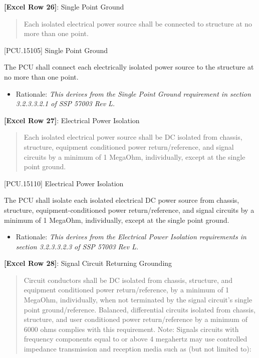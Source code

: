 \textbf{[Excel Row 26]}: Single Point Ground

\begin{quote}
Each isolated electrical power source shall be connected to structure at no more than one point.
\end{quote}

[PCU.15105] Single Point Ground

The PCU shall connect each electrically isolated power source to the structure at no more than one point.

\begin{itemize}
\item{} Rationale: \emph{This derives from the Single Point Ground requirement in section 3.2.3.3.2.1 of SSP 57003 Rev L.}

\end{itemize}

\textbf{[Excel Row 27]}: Electrical Power Isolation

\begin{quote}
Each isolated electrical power source shall be DC isolated from chassis, structure, equipment conditioned power return\slash reference, and signal circuits by a minimum of 1 MegaOhm, individually, except at the single point ground.
\end{quote}

[PCU.15110] Electrical Power Isolation

The PCU shall isolate each isolated electrical DC power source from chassis, structure, equipment-conditioned power return\slash reference, and signal circuits by a minimum of 1 MegaOhm, individually, except at the single point ground.

\begin{itemize}
\item{} Rationale: \emph{This derives from the Electrical Power Isolation requirements in section 3.2.3.3.2.3 of SSP 57003 Rev L.}

\end{itemize}

\textbf{[Excel Row 28]}: Signal Circuit Returning Grounding

\begin{quote}
Circuit conductors shall be DC isolated from chassis, structure, and equipment conditioned power return\slash reference, by a minimum of 1 MegaOhm, individually, when not terminated by the signal circuit's single point ground\slash reference. Balanced, differential circuits isolated from chassis, structure, and user conditioned power return\slash reference by a minimum of 6000 ohms complies with this requirement.
Note: Signals circuits with frequency components equal to or above 4 megahertz may use controlled impedance transmission and reception media such as (but not limited to):
\end{quote}

